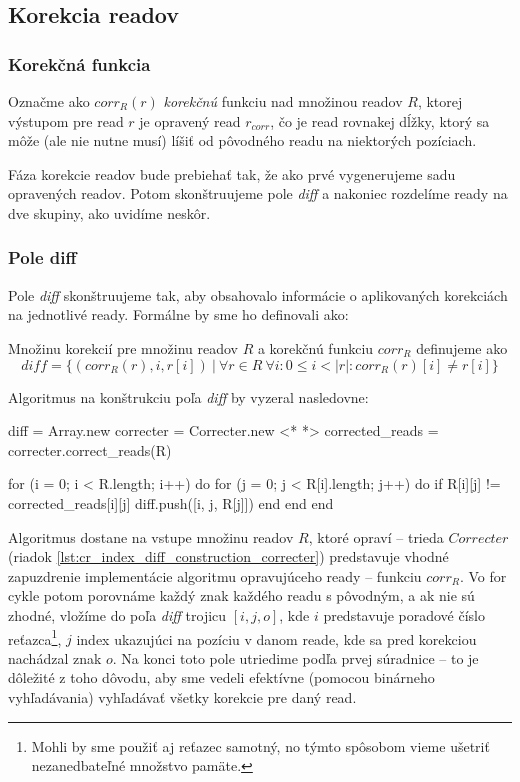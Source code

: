 \subsection{Korekcia readov}
\label{ssec:korekcia_readov}
\subsubsection{Korekčná funkcia}
\begin{ozn}
Označme ako $corr_R(r)$ \emph{korekčnú} funkciu nad množinou readov $R$, ktorej výstupom pre read $r$ je opravený read $r_{corr}$, čo je read rovnakej dĺžky, ktorý sa môže (ale nie nutne musí) líšiť od pôvodného readu na niektorých pozíciach.
\end{ozn}

Fáza korekcie readov bude prebiehať tak, že ako prvé vygenerujeme sadu opravených readov. Potom skonštruujeme pole \emph{diff} a nakoniec rozdelíme ready na dve skupiny, ako uvidíme neskôr.

\subsubsection{Pole diff}
Pole \emph{diff} skonštruujeme tak, aby obsahovalo informácie o aplikovaných korekciách na jednotlivé ready. Formálne by sme ho definovali ako:

\begin{defn}
Množinu korekcií pre množinu readov $R$ a korekčnú funkciu $corr_R$ definujeme ako 
$$
diff = \{(corr_R(r), i, r[i])~|~\forall r \in R~\forall i : 0 \leq i < |r| : corr_R(r)[i] \neq r[i] \}
$$
\end{defn}

Algoritmus na konštrukciu poľa \emph{diff} by vyzeral nasledovne:

\bigskip
\begin{pseudocode}[label=lst:cr_index_diff_construction,caption={Algoritmus konštrukcie poľa diff.}]
diff = Array.new
correcter = Correcter.new <* \label{lst:cr_index_diff_construction_correcter} *>
corrected_reads = correcter.correct_reads(R)

for (i = 0; i < R.length; i++) do
  for (j = 0; j < R[i].length; j++) do
    if R[i][j] != corrected_reads[i][j]
      diff.push([i, j, R[j]])
    end  
  end
end
\end{pseudocode}
\bigskip

Algoritmus dostane na vstupe množinu readov $R$, ktoré opraví -- trieda $Correcter$ (riadok \ref{lst:cr_index_diff_construction_correcter}) predstavuje vhodné zapuzdrenie implementácie algoritmu opravujúceho ready -- funkciu $corr_R$. Vo for cykle potom porovnáme každý znak každého readu s pôvodným, a ak nie sú zhodné, vložíme do poľa \emph{diff} trojicu $[i, j, o]$, kde $i$ predstavuje poradové číslo reťazca\footnote{Mohli by sme použiť aj reťazec samotný, no týmto spôsobom vieme ušetriť nezanedbateľné množstvo pamäte.}, $j$ index ukazujúci na pozíciu v danom reade, kde sa pred korekciou nachádzal znak $o$. Na konci toto pole utriedime podľa prvej súradnice -- to je dôležité z toho dôvodu, aby sme vedeli efektívne (pomocou binárneho vyhľadávania) vyhľadávať všetky korekcie pre daný read.

